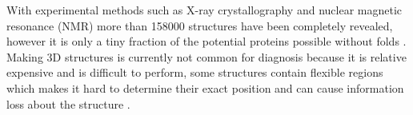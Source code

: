 With experimental methods such as X-ray crystallography and nuclear magnetic resonance (NMR) more than 158000 structures \cite{wwpdb_wwpdb:_nodate} have been completely revealed, however it is only a tiny fraction of the potential proteins possible without folds \cite{ cantrill_chemiotics:_nodate}.
Making 3D structures is currently not common for diagnosis because it is relative expensive and is difficult to perform, some structures contain flexible regions which makes it hard to determine their exact position and can cause information loss about the structure \cite{pdb101_pdb101:_nodate, ridgen_protein_nodate}.
\label{subsec:GD_Addition_of_structural_data}
\newpage


%
%

